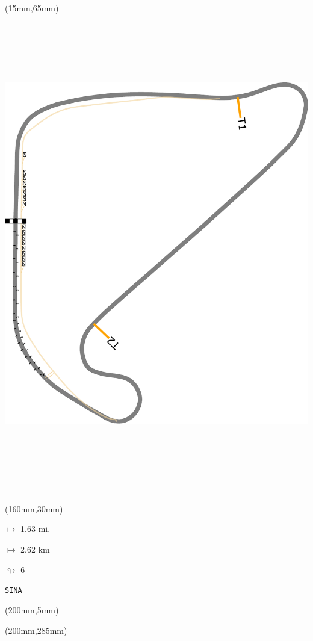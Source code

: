 \begin{textblock*}{185mm}(15mm,65mm)%
\centering
\mbox{\includegraphics[width=185mm,height=210mm,keepaspectratio]{PT/SINA.pdf}}
\end{textblock*}
\begin{textblock*}{40mm}(160mm,30mm)%
\Large
\par$\mapsto$ 1.63 mi.
\par$\mapsto$ 2.62 km
\par$\looparrowright$ 6
\par\hfill\tiny\tt SINA\\
\end{textblock*}
\begin{textblock*}{20mm}(200mm,5mm)%
\fbox{\thepage}
\label{SINA}
\end{textblock*}
\begin{textblock*}{20mm}(200mm,285mm)%
\fbox{\thepage}
\end{textblock*}

